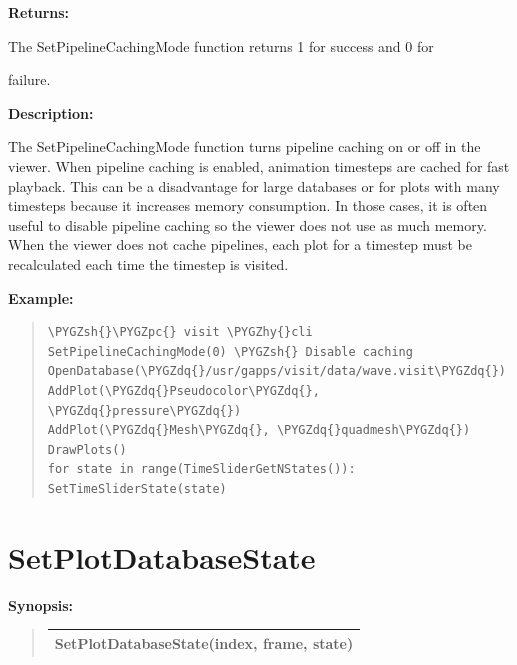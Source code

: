 \documentclass[letterpaper,10pt,english]{sphinxmanual}
\def\PYGZsh{\char`\#}
\def\PYGZpc{\char`\%}
\def\PYGZhy{\char`\-}
\def\PYGZdq{\char`\"}
\begin{document}
\begin{DUlineblock}{0em}
\item[] 
\item[] \textbf{Returns:}
\item[] The SetPipelineCachingMode function returns 1 for success and 0 for
\item[] failure.
\item[] 
\item[] \textbf{Description:}
\item[] The SetPipelineCachingMode function turns pipeline caching on or off in
the viewer. When pipeline caching is enabled, animation timesteps are
cached for fast playback. This can be a disadvantage for large databases or
for plots with many timesteps because it increases memory consumption. In
those cases, it is often useful to disable pipeline caching so the viewer
does not use as much memory. When the viewer does not cache pipelines, each
plot for a timestep must be recalculated each time the timestep is visited.
\end{DUlineblock}

\begin{DUlineblock}{0em}
\item[] 
\end{DUlineblock}

\begin{DUlineblock}{0em}
\item[] \textbf{Example:}
\item[] 
\end{DUlineblock}
\begin{quote}

\begin{Verbatim}[commandchars=\\\{\}]
\PYGZsh{}\PYGZpc{} visit \PYGZhy{}cli
SetPipelineCachingMode(0) \PYGZsh{} Disable caching
OpenDatabase(\PYGZdq{}/usr/gapps/visit/data/wave.visit\PYGZdq{})
AddPlot(\PYGZdq{}Pseudocolor\PYGZdq{}, \PYGZdq{}pressure\PYGZdq{})
AddPlot(\PYGZdq{}Mesh\PYGZdq{}, \PYGZdq{}quadmesh\PYGZdq{})
DrawPlots()
for state in range(TimeSliderGetNStates()):
SetTimeSliderState(state)
\end{Verbatim}
\end{quote}


\section{SetPlotDatabaseState}
\label{functions:setplotdatabasestate}
\begin{DUlineblock}{0em}
\item[] \textbf{Synopsis:}
\end{DUlineblock}
\begin{quote}

\begin{tabulary}{\linewidth}{|L|}
\hline

SetPlotDatabaseState(index, frame, state)
\\
\hline\end{tabulary}

\end{quote}
\end{document}
